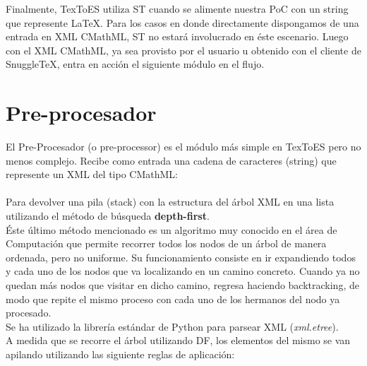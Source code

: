 Finalmente, TexToES utiliza ST cuando se alimente nuestra PoC con un string que represente LaTeX. Para los casos en donde directamente dispongamos de una entrada en XML CMathML, ST no estará involucrado en éste escenario.
Luego con el XML CMathML, ya sea provisto por el usuario u obtenido con el cliente de SnuggleTeX, entra en acción el siguiente módulo en el flujo.

\section{Pre-procesador}

El Pre-Procesador (o pre-processor) es el módulo más simple en TexToES pero no menos complejo. Recibe como entrada una cadena de caracteres (string) que represente un XML del tipo CMathML:\\[0.01cm]

\\[0.01cm]

Para devolver una pila (stack) con la estructura del árbol XML en una lista utilizando el método de búsqueda \textbf{depth-first}.\\

Éste último método mencionado es un algoritmo muy conocido en el área de Computación que permite recorrer todos los nodos de un árbol de manera ordenada, pero no uniforme. Su funcionamiento consiste en ir expandiendo todos y cada uno de los nodos que va localizando en un camino concreto. Cuando ya no quedan más nodos que visitar en dicho camino, regresa haciendo backtracking, de modo que repite el mismo proceso con cada uno de los hermanos del nodo ya procesado.\\

Se ha utilizado la librería estándar de Python para parsear XML (\textit{xml.etree}).\\

A medida que se recorre el árbol utilizando DF, los elementos del mismo se van apilando utilizando las siguiente reglas de aplicación:


